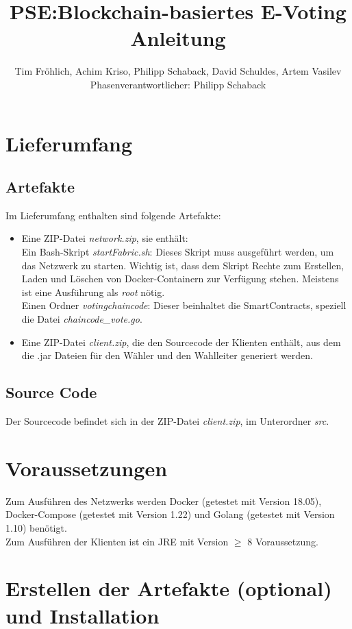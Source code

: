 \documentclass[parskip=full]{scrartcl}
\title{
	PSE:Blockchain-basiertes E-Voting \\
	Anleitung
}
\author{Tim Fröhlich, Achim Kriso, Philipp Schaback, David Schuldes, Artem Vasilev\\ Phasenverantwortlicher: Philipp Schaback}
\begin{document}
	\clearpage
	\maketitle
	\newpage
	
	\tableofcontents
	\newpage
	
	\section{Lieferumfang}
	\subsection{Artefakte}
	Im Lieferumfang enthalten sind folgende Artefakte:
	\begin{itemize}
		\item Eine ZIP-Datei \textit{network.zip}, sie enthält:\\
		Ein Bash-Skript \textit{startFabric.sh}: Dieses Skript muss ausgeführt werden, um das Netzwerk zu starten. Wichtig ist, dass dem Skript Rechte zum Erstellen, Laden und Löschen von Docker-Containern zur Verfügung stehen. Meistens ist eine Ausführung als \textit{root} nötig.\\
		Einen Ordner \textit{votingchaincode}: Dieser beinhaltet die SmartContracts, speziell die Datei \textit{chaincode\_vote.go}.
		\item Eine ZIP-Datei \textit{client.zip}, die den Sourcecode der Klienten enthält, aus dem die .jar Dateien für den Wähler und den Wahlleiter generiert werden.
	\end{itemize}

	\subsection{Source Code}
	Der Sourcecode befindet sich in der ZIP-Datei \textit{client.zip}, im Unterordner \textit{src}.
	
	\section{Voraussetzungen}
	Zum Ausführen des Netzwerks werden Docker (getestet mit Version 18.05), Docker-Compose (getestet mit Version 1.22) und Golang (getestet mit Version 1.10) benötigt.\\
	Zum Ausführen der Klienten ist ein JRE mit Version $\ge$ 8 Voraussetzung.
	\section{Erstellen der Artefakte (optional) und Installation}
\end{document}

